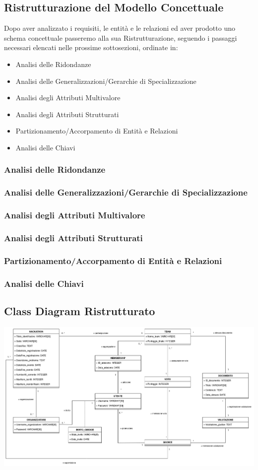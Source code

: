 \documentclass[a4paper, 11pt]{article}
\begin{document}
	\subsection{Ristrutturazione del Modello Concettuale}
	Dopo aver analizzato i requisiti, le entità e le relazioni ed aver prodotto uno schema concettuale passeremo alla sua Ristrutturazione, seguendo i passaggi necessari elencati nelle prossime sottosezioni, ordinate in:
	\begin{itemize}
		\item Analisi delle Ridondanze
		\item Analisi delle Generalizzazioni/Gerarchie di Specializzazione
		\item Analisi degli Attributi Multivalore
		\item Analisi degli Attributi Strutturati
		\item Partizionamento/Accorpamento di Entità e Relazioni
		\item Analisi delle Chiavi
	\end{itemize}
	\subsubsection{Analisi delle Ridondanze}
	
	\subsubsection{Analisi delle Generalizzazioni/Gerarchie di Specializzazione}
	\subsubsection{Analisi degli Attributi Multivalore}
	\subsubsection{Analisi degli Attributi Strutturati}
	\subsubsection{Partizionamento/Accorpamento di Entità e Relazioni}
	\subsubsection{Analisi delle Chiavi}
	\subsection{Class Diagram Ristrutturato}
	\includegraphics[width=1\textwidth]{../Immagini/Hackathon_UMLRistrutturato}
	\newpage
\end{document}
